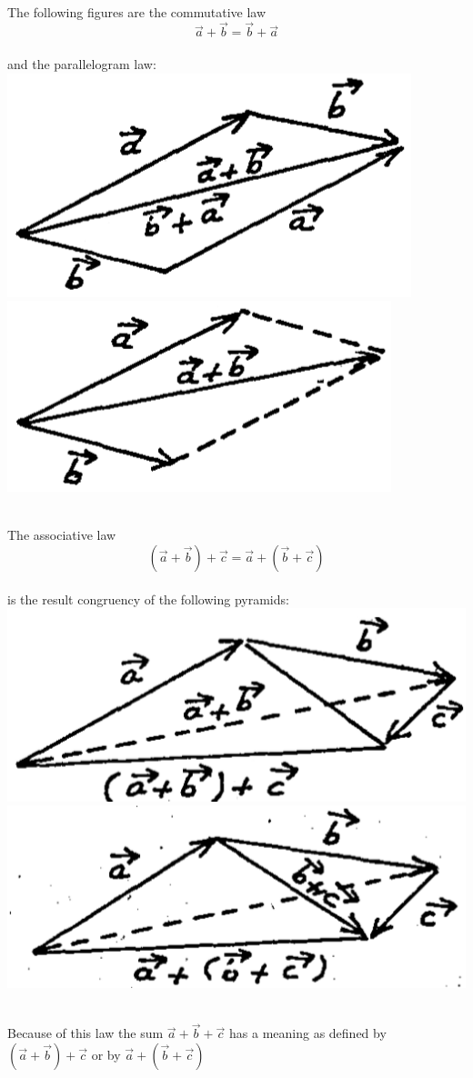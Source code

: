 \documentclass[11pt]{amsbook}
\begin{document}
    \\ The following figures are the commutative law 
     \[ \vec{a} + \vec{b} =  \vec{b} + \vec{a}\]
    \\ and the parallelogram law:
    \\\includegraphics[scale=0.7]{images/b2p1-122_fig3}
    \includegraphics[scale = 0.7]{images/b2p1-122_fig4}
    
    \\ The associative law
     \[ (\vec{a} + \vec{b}) + \vec{c} =  \vec{a} + (\vec{b} + \vec{c})\]
     \\ is the result congruency of the following pyramids:
      \\\includegraphics[scale=0.7]{images/b2p1-122_fig5}
      \includegraphics[scale = 0.7]{images/b2p1-122_fig6}
      
      \\ Because of this law the sum \( \vec{a} + \vec{b} + \vec{c} \) has a meaning as defined by \( (\vec{a} + \vec{b}) + \vec{c} \) or by \( \vec{a} + (\vec{b} + \vec{c}) \)
    
    
   
  

\end{document}
